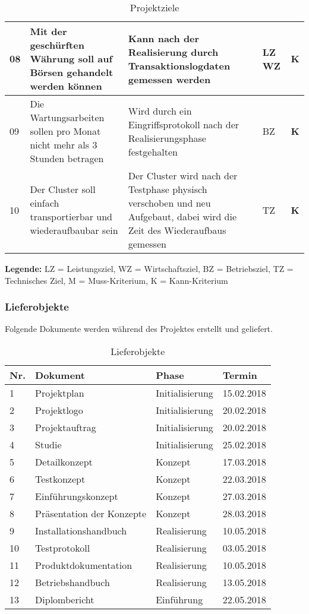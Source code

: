 \begin{table}[H]
\begin{tabular}[t]{p{0.7cm}|p{6.1cm}p{6.1cm} >{\centering}p{0.6cm}c}
08 & Mit der geschürften Währung soll auf Börsen gehandelt werden können & Kann nach der Realisierung durch Transaktionslogdaten gemessen werden & LZ \newline WZ & \textbf{K} \\\hline
09 & Die Wartungsarbeiten sollen pro Monat nicht mehr als 3 Stunden betragen & Wird durch ein Eingriffsprotokoll nach der Realisierungsphase festgehalten & BZ & \textbf{K} \\\hline
10 & Der Cluster soll einfach transportierbar und wiederaufbaubar sein & Der Cluster wird nach der Testphase physisch verschoben und neu Aufgebaut, dabei wird die Zeit des Wiederaufbaus gemessen & TZ & \textbf{K}\\\hline
\end{tabular}
\caption{Projektziele}
\end{table}

\textbf{Legende:} LZ = Leistungsziel, WZ = Wirtschaftsziel, BZ = Betriebsziel, TZ = Technisches Ziel, \newline M = Muss-Kriterium, K = Kann-Kriterium

\subsubsection{Lieferobjekte}
Folgende Dokumente werden während des Projektes erstellt und geliefert.

\begin{table}[H]
\begin{tabular}[t]{p{0.5cm}p{6.5cm}p{6.5cm}p{1.8cm}}
\hline
\rowcolor{heading}\textbf{Nr.} & \textbf{Dokument} & \textbf{Phase} & \textbf{Termin} \\\hline
1 & Projektplan & Initialisierung & 15.02.2018 \\\hline
2 & Projektlogo & Initialisierung & 20.02.2018 \\\hline
3 & Projektauftrag & Initialisierung & 20.02.2018 \\\hline
4 & Studie & Initialisierung & 25.02.2018 \\\hline
5 & Detailkonzept & Konzept & 17.03.2018 \\\hline
6 & Testkonzept & Konzept & 22.03.2018 \\\hline
7 & Einführungskonzept & Konzept & 27.03.2018 \\\hline
8 & Präsentation der Konzepte & Konzept & 28.03.2018 \\\hline
9 & Installationshandbuch & Realisierung & 10.05.2018 \\\hline
10 & Testprotokoll & Realisierung & 03.05.2018 \\\hline
11 & Produktdokumentation & Realisierung & 10.05.2018 \\\hline
12 & Betriebshandbuch & Realisierung & 13.05.2018 \\\hline
13 & Diplombericht & Einführung & 22.05.2018 \\\hline

\end{tabular}
\caption{Lieferobjekte}
\end{table}


 
